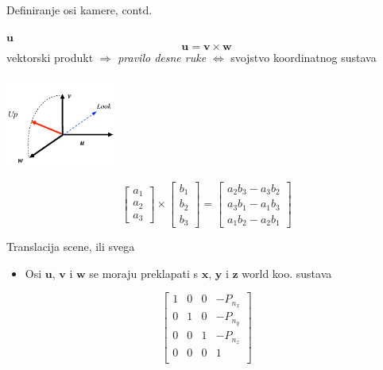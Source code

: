 \documentclass[9pt]{beamer}
\begin{document}
\begin{frame}{Definiranje osi kamere, contd.}
	\begin{block}{$\mathbf{u}$}
		\begin{equation}
		\mathbf{u} = \mathbf{v} \times \mathbf{w} \nonumber
		\end{equation}	
		vektorski produkt $\Rightarrow$ \textsl{pravilo desne ruke} $\Leftrightarrow$
		svojstvo koordinatnog sustava 
	\end{block}
	\begin{center}
		\includegraphics[height=3cm]{slike/02_view_01.png}
	\end{center}
	\begin{equation}
	\left[ \begin{array}{c}
	a_{1}\\
	a_{2}\\
	a_{3}\end{array}\right]  \times \left[ \begin{array}{c}
	b_{1}\\
	b_{2}\\
	b_{3}\end{array}\right] = \left[ \begin{array}{c}
	a_{2}b_{3} - a_{3}b_{2}\\
	a_{3}b_{1}-a_{1}b_{3}\\
	a_{1}b_{2}-a_{2}b_{1}\end{array}\right]\nonumber
	\end{equation}	
\end{frame}

\begin{frame}{Translacija scene, ili svega}
	\begin{itemize}
		\item Osi $\mathbf{u}$, $\mathbf{v}$ i $\mathbf{w}$ se moraju preklapati s 
		$\mathbf{x}$, $\mathbf{y}$ i $\mathbf{z}$ world koo. sustava
	\end{itemize}
	\begin{equation}
	\left[ \begin{array}{cccc}
	1 & 0 & 0 & -P_{n_{x}}\\
	0 & 1 & 0 & -P_{n_{y}} \\
	0 & 0 & 1 & -P_{n_{z}} \\
	0 & 0 & 0 & 1 			\\\end{array}\right]\nonumber
	\end{equation}	
\end{frame}
\end{document}
